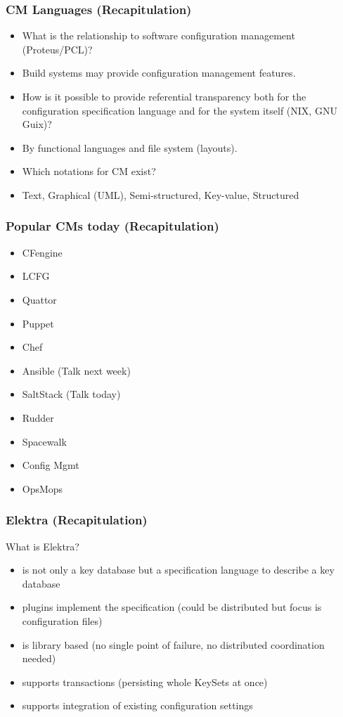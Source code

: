 \begin{frame}
	\frametitle{CM Languages (Recapitulation)}

	\begin{itemize}[<+-| alert@+>]
	\item What is the relationship to software configuration management (Proteus/PCL)?
	\item[] Build systems may provide configuration management features.
	\item How is it possible to provide referential transparency both for the configuration specification language and for the system itself (NIX, GNU Guix)?
	\item[] By functional languages and file system (layouts).
	\item Which notations for CM exist?
	\item[] Text,  Graphical (UML), Semi-structured, Key-value, Structured
	\end{itemize}
\end{frame}

\begin{frame}
	\frametitle{Popular CMs today (Recapitulation)}

	\begin{itemize} %
	\item CFengine
	\item LCFG
	\item Quattor
	\item Puppet
	\item Chef
	\item Ansible (Talk next week)
	\item SaltStack (Talk today)
	\item Rudder
	\item Spacewalk

	\item Config Mgmt
	\item OpsMops
	\end{itemize}
\end{frame}

\begin{frame}
	\frametitle{Elektra (Recapitulation)}

	\begin{task}
	What is Elektra?
	\end{task}

	\pause

	\begin{itemize}
	\item is not only a key database but a specification language to describe a key database
	\item plugins implement the specification (could be distributed but focus is configuration files)
	\item is library based (no single point of failure, no distributed coordination needed)
	\item supports transactions (persisting whole KeySets at once)
	\item supports integration of existing configuration settings
	\end{itemize}
\end{frame}



